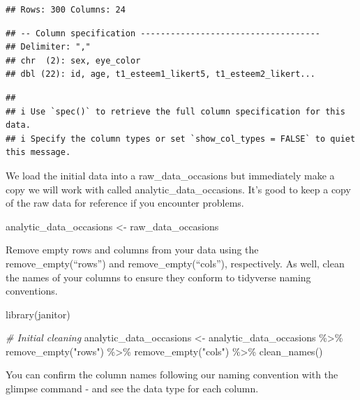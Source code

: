 \documentclass[
]{krantz}
\makeatletter
\newenvironment{Shaded}{\begin{snugshade}}{\end{snugshade}}
\newcommand{\CommentTok}[1]{\textcolor[rgb]{0.37,0.37,0.37}{\textit{#1}}}
\newcommand{\FunctionTok}[1]{\textcolor[rgb]{0,0,0}{#1}}
\newcommand{\NormalTok}[1]{#1}
\newcommand{\OtherTok}[1]{\textcolor[rgb]{0.37,0.37,0.37}{#1}}
\newcommand{\SpecialCharTok}[1]{\textcolor[rgb]{0,0,0}{#1}}
\newcommand{\StringTok}[1]{\textcolor[rgb]{0.5,0.5,0.5}{#1}}
\newenvironment{kframe}{%
\medskip{}
\setlength{\fboxsep}{.8em}
 \def\at@end@of@kframe{}%
 \ifinner\ifhmode%
  \def\at@end@of@kframe{\end{minipage}}%
  \begin{minipage}{\columnwidth}%
 \fi\fi%
 \def\FrameCommand##1{\hskip\@totalleftmargin \hskip-\fboxsep
 \colorbox{shadecolor}{##1}\hskip-\fboxsep
     \hskip-\linewidth \hskip-\@totalleftmargin \hskip\columnwidth}%
 \MakeFramed {\advance\hsize-\width
   \@totalleftmargin\z@ \linewidth\hsize
   \@setminipage}}%
 {\par\unskip\endMakeFramed%
 \at@end@of@kframe}
\renewenvironment{Shaded}{\begin{kframe}}{\end{kframe}}
\makeatother
\begin{document}
\begin{verbatim}
## Rows: 300 Columns: 24
\end{verbatim}

\begin{verbatim}
## -- Column specification ------------------------------------
## Delimiter: ","
## chr  (2): sex, eye_color
## dbl (22): id, age, t1_esteem1_likert5, t1_esteem2_likert...
\end{verbatim}

\begin{verbatim}
## 
## i Use `spec()` to retrieve the full column specification for this data.
## i Specify the column types or set `show_col_types = FALSE` to quiet this message.
\end{verbatim}

We load the initial data into a raw\_data\_occasions but immediately make a copy we will work with called analytic\_data\_occasions. It's good to keep a copy of the raw data for reference if you encounter problems.

\begin{Shaded}
\begin{Highlighting}[]
\NormalTok{analytic\_data\_occasions }\OtherTok{\textless{}{-}}\NormalTok{ raw\_data\_occasions}
\end{Highlighting}
\end{Shaded}

Remove empty rows and columns from your data using the remove\_empty(``rows'') and remove\_empty(``cols''), respectively. As well, clean the names of your columns to ensure they conform to tidyverse naming conventions.

\begin{Shaded}
\begin{Highlighting}[]
\FunctionTok{library}\NormalTok{(janitor)}

\CommentTok{\# Initial cleaning}
\NormalTok{analytic\_data\_occasions }\OtherTok{\textless{}{-}}\NormalTok{ analytic\_data\_occasions }\SpecialCharTok{\%\textgreater{}\%}
  \FunctionTok{remove\_empty}\NormalTok{(}\StringTok{"rows"}\NormalTok{) }\SpecialCharTok{\%\textgreater{}\%}
  \FunctionTok{remove\_empty}\NormalTok{(}\StringTok{"cols"}\NormalTok{) }\SpecialCharTok{\%\textgreater{}\%}
  \FunctionTok{clean\_names}\NormalTok{()}
\end{Highlighting}
\end{Shaded}

You can confirm the column names following our naming convention with the glimpse command - and see the data type for each column.
\end{document}
